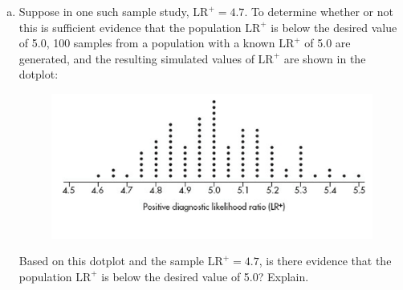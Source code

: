 \documentclass[a4paper, 12pt,twoside]{book}
\begin{document}
{{\begin{enumerate}[(a)]
      What was $\text{LR}^+$ in this study, and explain why the larger the value of $\text{LR}^+$, the more useful the test.
      \item  Suppose in one such sample study, $\text{LR}^+ = 4.7$. To determine whether or not this is sufficient evidence that the population $\text{LR}^+$ is below the desired value of 5.0, 100 samples from a population with a known $\text{LR}^+$ of 5.0 are generated, and the resulting simulated values of $\text{LR}^+$ are shown in the dotplot:
      \begin{figure}[H]
      \centering
      \includegraphics[scale=0.6]{InvestigationHT}
      \end{figure}
      
      
   Based on this dotplot and the sample $\text{LR}^+ = 4.7$, is there evidence that the population $\text{LR}^+$ is below the desired value of 5.0? Explain.
  \end{enumerate}  
  }}
\end{document}
